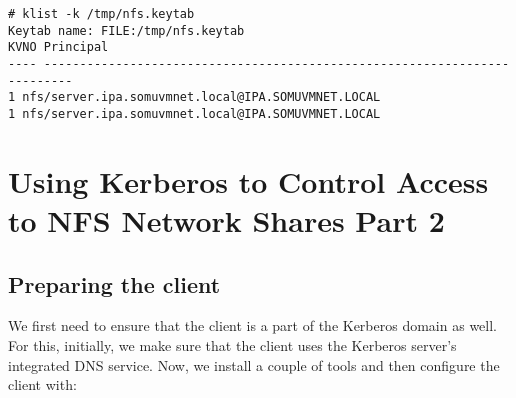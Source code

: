 \vspace{-15pt}
\begin{verbatim}
# klist -k /tmp/nfs.keytab
Keytab name: FILE:/tmp/nfs.keytab
KVNO Principal
---- --------------------------------------------------------------------------
1 nfs/server.ipa.somuvmnet.local@IPA.SOMUVMNET.LOCAL
1 nfs/server.ipa.somuvmnet.local@IPA.SOMUVMNET.LOCAL
\end{verbatim}
\vspace{-10pt}	

\section{Using Kerberos to Control Access to NFS Network Shares Part 2}
\vspace{-10pt}
\subsection{Preparing the client}
We first need to ensure that the client is a part of the Kerberos domain as well. For this, initially, we make sure that the client uses the Kerberos server's integrated DNS service. Now, we install a couple of tools and then configure the client with:

